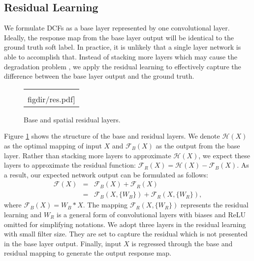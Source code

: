 \documentclass[10pt,twocolumn,letterpaper]{article}
\newcommand{\figdir}{figures}
\begin{document}
\subsection{Residual Learning}\label{sec:res}
We formulate DCFs as a base layer represented by one convolutional layer. Ideally, the response map from the base layer output will be identical to the ground truth soft label. In practice, it is unlikely that a single layer network is able to accomplish that. Instead of stacking more layers which may cause the degradation problem \cite{he-cvpr16-resnet}, we apply the residual learning to effectively capture the difference between the base layer output and the ground truth.

\begin{figure}[t]
\begin{center}
\begin{tabular}{c}
\texttt{[image: \\figdir/res.pdf]}\\
\end{tabular}
\end{center}
\vspace{-3mm}
\caption{Base and spatial residual layers.}
\label{fig:res}
\end{figure}

Figure \ref{fig:res} shows the structure of the base and residual layers. We denote $\mathcal{H}(X)$ as the optimal mapping of input $X$ and $\mathcal{F}_B(X)$ as the output from the base layer. Rather than stacking more layers to approximate $\mathcal{H}(X)$, we expect these layers to approximate the residual function: $\mathcal{F}_{R}(X)=\mathcal{H}(X)-\mathcal{F}_B(X)$. As a result, our expected network output can be formulated as follows:
\begin{eqnarray}\label{eq:res}
\mathcal{F}(X)&=&\mathcal{F}_B(X)+\mathcal{F}_{R}(X)\nonumber\\
&=&\mathcal{F}_B(X,\{W_B\})+\mathcal{F}_{R}(X,\{W_{R}\}),
\end{eqnarray}
where $\mathcal{F}_B(X)=W_B\ast X$. The mapping $\mathcal{F}_{R}(X,\{W_{R}\})$ represents the residual learning and $W_{R}$ is a general form of convolutional layers with biases and ReLU \cite{nair-icml10-relu} omitted for simplifying notations. We adopt three layers in the residual learning with small filter size. They are set to capture the residual which is not presented in the base layer output. Finally, input $X$ is regressed through the base and residual mapping to generate the output response map.
\end{document}
